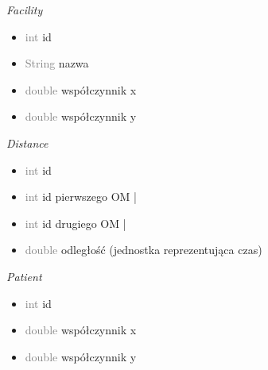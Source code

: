 \documentclass[]{article}
\begin{document}
    \textit{Facility}
    \begin{itemize}
        \item  \textcolor{gray}{int} id
        \item  \textcolor{gray}{String}  nazwa
        \item  \textcolor{gray}{double}  współczynnik x
        \item \textcolor{gray}{double}  współczynnik y
    \end{itemize}

    \textit{Distance}
    \begin{itemize}
        \item \textcolor{gray}{int}  id
        \item  \textcolor{gray}{int} id pierwszego OM |
        \item  \textcolor{gray}{int} id drugiego OM |
        \item \textcolor{gray}{double}  odległość (jednostka reprezentująca czas)
    \end{itemize}

    \textit{Patient}
    \begin{itemize}
        \item  \textcolor{gray}{int} id
        \item \textcolor{gray}{double}  współczynnik x
        \item \textcolor{gray}{double}  współczynnik y
    \end{itemize}
\end{document}
